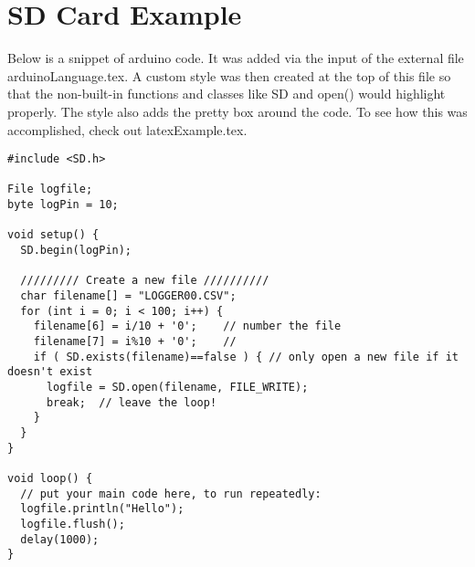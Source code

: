 \documentclass[12pt]{article} %
\begin{document}
\section{SD Card Example}
Below is a snippet of arduino code.  It was added  via the input of the external
 file arduinoLanguage.tex.  A custom style was then created at the top of this
 file so that the non-built-in functions and classes like SD and open() would highlight
 properly.  The style also adds the pretty box around the code.  To see how this was
 accomplished, check out latexExample.tex. \\

\begin{lstlisting}[style=myArduino]
#include <SD.h>

File logfile;
byte logPin = 10;

void setup() {
  SD.begin(logPin);

  ///////// Create a new file //////////
  char filename[] = "LOGGER00.CSV";
  for (int i = 0; i < 100; i++) {
    filename[6] = i/10 + '0';    // number the file
    filename[7] = i%10 + '0';    //
    if ( SD.exists(filename)==false ) { // only open a new file if it doesn't exist
      logfile = SD.open(filename, FILE_WRITE);
      break;  // leave the loop!
    }
  }
}

void loop() {
  // put your main code here, to run repeatedly:
  logfile.println("Hello");
  logfile.flush();
  delay(1000);
}
\end{lstlisting}
\end{document}
